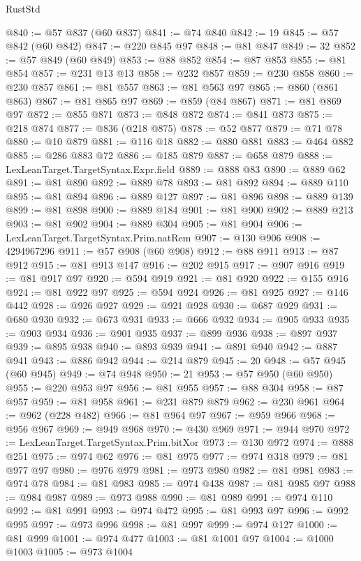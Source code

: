 \begin{lexlean}{RustStd}
\begin{coremodule}
@840 := @57 @837 (@60 @837)
@841 := @74 @840
@842 := 19
@845 := @57 @842 (@60 @842)
@847 := @220 @845 @97
@848 := @81 @847
@849 := 32
@852 := @57 @849 (@60 @849)
@853 := @88 @852
@854 := @87 @853
@855 := @81 @854
@857 := @231 @13 @13
@858 := @232 @857
@859 := @230 @858
@860 := @230 @857
@861 := @81 @557
@863 := @81 @563 @97
@865 := @860 (@861 @863)
@867 := @81 @865 @97
@869 := @859 (@84 @867)
@871 := @81 @869 @97
@872 := @855 @871
@873 := @848 @872
@874 := @841 @873
@875 := @218 @874
@877 := @836 (@218 @875)
@878 := @52 @877
@879 := @71 @78
@880 := @10 @879
@881 := @116 @18
@882 := @880 @881
@883 := @464 @882
@885 := @286 @883 @72
@886 := @185 @879
@887 := @658 @879
@888 := LexLeanTarget.TargetSyntax.Expr.field
@889 := @888 @83
@890 := @889 @62
@891 := @81 @890
@892 := @889 @78
@893 := @81 @892
@894 := @889 @110
@895 := @81 @894
@896 := @889 @127
@897 := @81 @896
@898 := @889 @139
@899 := @81 @898
@900 := @889 @184
@901 := @81 @900
@902 := @889 @213
@903 := @81 @902
@904 := @889 @304
@905 := @81 @904
@906 := LexLeanTarget.TargetSyntax.Prim.natRem
@907 := @130 @906
@908 := 4294967296
@911 := @57 @908 (@60 @908)
@912 := @88 @911
@913 := @87 @912
@915 := @81 @913 @147
@916 := @202 @915
@917 := @907 @916
@919 := @81 @917 @97
@920 := @594 @919
@921 := @81 @920
@922 := @155 @916
@924 := @81 @922 @97
@925 := @594 @924
@926 := @81 @925
@927 := @146 @442
@928 := @926 @927
@929 := @921 @928
@930 := @687 @929
@931 := @680 @930
@932 := @673 @931
@933 := @666 @932
@934 := @905 @933
@935 := @903 @934
@936 := @901 @935
@937 := @899 @936
@938 := @897 @937
@939 := @895 @938
@940 := @893 @939
@941 := @891 @940
@942 := @887 @941
@943 := @886 @942
@944 := @214 @879
@945 := 20
@948 := @57 @945 (@60 @945)
@949 := @74 @948
@950 := 21
@953 := @57 @950 (@60 @950)
@955 := @220 @953 @97
@956 := @81 @955
@957 := @88 @304
@958 := @87 @957
@959 := @81 @958
@961 := @231 @879 @879
@962 := @230 @961
@964 := @962 (@228 @482)
@966 := @81 @964 @97
@967 := @959 @966
@968 := @956 @967
@969 := @949 @968
@970 := @430 @969
@971 := @944 @970
@972 := LexLeanTarget.TargetSyntax.Prim.bitXor
@973 := @130 @972
@974 := @888 @251
@975 := @974 @62
@976 := @81 @975
@977 := @974 @318
@979 := @81 @977 @97
@980 := @976 @979
@981 := @973 @980
@982 := @81 @981
@983 := @974 @78
@984 := @81 @983
@985 := @974 @438
@987 := @81 @985 @97
@988 := @984 @987
@989 := @973 @988
@990 := @81 @989
@991 := @974 @110
@992 := @81 @991
@993 := @974 @472
@995 := @81 @993 @97
@996 := @992 @995
@997 := @973 @996
@998 := @81 @997
@999 := @974 @127
@1000 := @81 @999
@1001 := @974 @477
@1003 := @81 @1001 @97
@1004 := @1000 @1003
@1005 := @973 @1004

\end{coremodule}
\end{lexlean}
